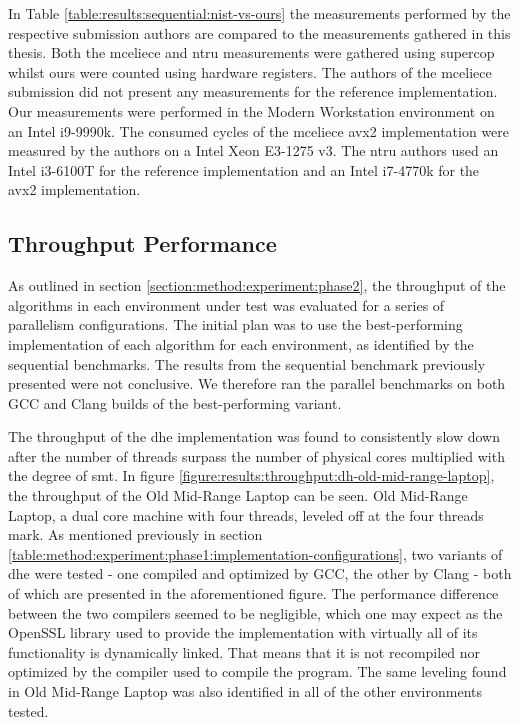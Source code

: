 In Table \ref{table:results:sequential:nist-vs-ours} the measurements performed by the respective submission authors are compared to the measurements gathered in this thesis. Both the \gls{mceliece} and \gls{ntru} measurements were gathered using \gls{supercop}~\cite{mceliece2020,ntru2020} whilst ours were counted using hardware registers. The authors of the \gls{mceliece} submission did not present any measurements for the reference implementation. Our measurements were performed in the Modern Workstation environment on an Intel i9-9990k. The consumed cycles of the \gls{mceliece} \gls{avx2} implementation were measured by the authors on a Intel Xeon E3-1275 v3. The \gls{ntru} authors used an Intel i3-6100T for the reference implementation and an Intel i7-4770k for the \gls{avx2} implementation.

\subsection{Throughput Performance}

As outlined in section \ref{section:method:experiment:phase2}, the throughput of the algorithms in each environment under test was evaluated for a series of parallelism configurations. The initial plan was to use the best-performing implementation of each algorithm for each environment, as identified by the sequential benchmarks. The results from the sequential benchmark previously presented were not conclusive. We therefore ran the parallel benchmarks on both GCC and Clang builds of the best-performing variant.

The throughput of the \gls{dhe} implementation was found to consistently slow down after the number of threads surpass the number of physical cores multiplied with the degree of \gls{smt}. In figure \ref{figure:results:throughput:dh-old-mid-range-laptop}, the throughput of the Old Mid-Range Laptop can be seen. Old Mid-Range Laptop, a dual core machine with four threads, leveled off at the four threads mark. As mentioned previously in section \ref{table:method:experiment:phase1:implementation-configurations}, two variants of \gls{dhe} were tested - one compiled and optimized by GCC, the other by Clang - both of which are presented in the aforementioned figure. The performance difference between the two compilers seemed to be negligible, which one may expect as the OpenSSL library used to provide the implementation with virtually all of its functionality is dynamically linked. That means that it is not recompiled nor optimized by the compiler used to compile the program. The same leveling found in Old Mid-Range Laptop was also identified in all of the other environments tested.

